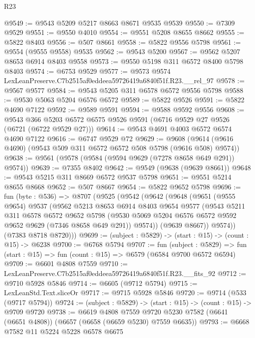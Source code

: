 \begin{lexlean}{R23}
\begin{coremodule}
@9549 := @9543 @5209 @5217 @8663 @8671 @9535 @9539
@9550 := @7309 @9529
@9551 := @9550 @4010
@9554 := @9551 @5208 @8655 @8662
@9555 := @5822 @8403
@9556 := @507 @8661
@9558 := @5822 @9556 @5798
@9561 := @9554 (@9555 @9558) @9535
@9562 := @9543 @5200
@9567 := @9562 @5207 @8653 @6914 @8403 @9558
@9573 := @9550 @5198 @311 @6572 @8400 @5798 @8403
@9574 := @6753 @9529
@9577 := @9573 @9574 LexLeanPreserve.C7b2515af0eddeea59726419a6840f51f.R23.__rel_97
@9578 := @9567 @9577
@9584 := @9543 @5205 @311 @6578 @6572 @9556 @5798
@9588 := @9530 @5063 @5204 @6576 @6572
@9589 := @5822 @9526
@9591 := @5822 @4690 @7122
@9592 := @9589 @9591
@9594 := @9588 @9592 @9556
@9608 := @9543 @366 @5203 @6572 @6575 @9526 @9591 (@6716 @9529 @27 @9526 (@6721 (@6722 @9529 @27)))
@9614 := @9543 @4691 @4003 @6572 @6574 @4690 @7122
@9616 := @6747 @9529 @72
@9629 := @9608 (@9614 (@9616 @4690) (@9543 @509 @311 @6572 @6572 @508 @5798 (@9616 @508) @9574))
@9638 := @9561 (@9578 (@9584 (@9594 @9629 (@7278 @8658 @649 @291)) @9574))
@9639 := @7355 @8402
@9642 := @9549 (@9638 (@9639 @8661))
@9648 := @9543 @5215 @311 @8669 @6572 @9537 @5798
@9651 := @9551 @5214 @8655 @8668
@9652 := @507 @8667
@9654 := @5822 @9652 @5798
@9696 := fun (byte : @536) =>
  @8707
    (@9525
      (@9542
        (@9642
          (@9648
            (@9651
              (@9555 @9654)
              @9537
              (@9562
                @5213
                @8653
                @6914
                @8403
                @9654
                @9577
                (@9543
                  @5211
                  @311
                  @6578
                  @6572
                  @9652
                  @5798
                  (@9530 @5069 @5204 @6576 @6572 @9592 @9652 @9629 (@7346 @8658 @649 @291))
                  @9574))
              (@9639 @8667))
            @9574))
        (@7383 @8718 @8720)))
@9699 := (subject : @5829) -> (start : @15) -> (count : @15) -> @6238
@9700 := @6768 @5794
@9707 := fun (subject : @5829) =>
  fun (start : @15) => fun (count : @15) => @6579 (@6584 @9700 @6572 @6594)
@9709 := @6601 @4808 @7559
@9710 := LexLeanPreserve.C7b2515af0eddeea59726419a6840f51f.R23.__fits_92
@9712 := @9710 @5928 @5846
@9714 := @6605 (@9712 @5794)
@9715 := LexLeanStd.Text.sliceOr
@9717 := @9715 @5928 @5846
@9720 := @9714 (@533 (@9717 @5794))
@9724 := (subject : @5829) -> (start : @15) -> (count : @15) -> @9709 @9720
@9738 := @6619
    @4808
    @7559
    @9720
    @5230
    @7582
    (@6641 (@6651 @4808))
    (@6657 (@6658 (@6659 @5230) @7559 @6635))
@9793 := @6668
    @7582
    @11
    @5224
    @5228
    @6578
    @6675

\end{coremodule}
\end{lexlean}
